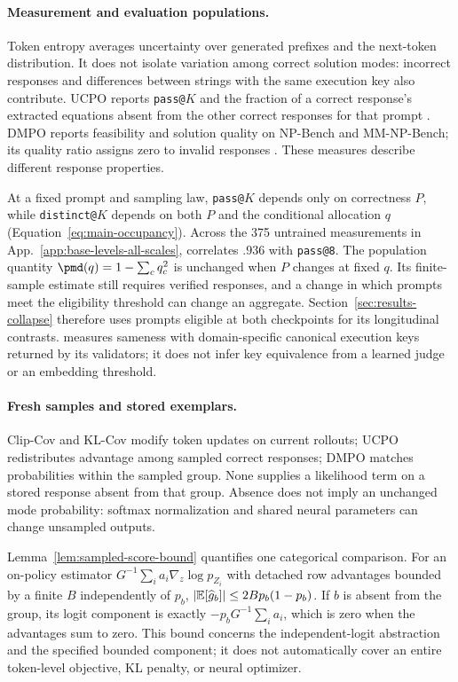 \paragraph{Measurement and evaluation populations.}
Token entropy averages uncertainty over generated prefixes and the next-token
distribution. It does not isolate variation among correct solution modes:
incorrect responses and differences between strings with the same execution
key also contribute. UCPO reports \texttt{pass@}$K$ and the fraction of a
correct response's extracted equations absent from the other correct
responses for that prompt \citep[App.~F]{lochab2026ucpo}. DMPO reports
feasibility and solution quality on NP-Bench and MM-NP-Bench; its quality
ratio assigns zero to invalid responses \citep[Section~4.2]{li2026distribution}.
These measures describe different response properties.

At a fixed prompt and sampling law, \texttt{pass@}$K$ depends only on
correctness $P$, while \texttt{distinct@}$K$ depends on both $P$ and the
conditional allocation $q$ (Equation~\eqref{eq:main-occupancy}). Across the
375 untrained measurements in App.~\ref{app:base-levels-all-scales},
\distk{} correlates $.936$ with \texttt{pass@8}.
The population quantity $\pmd(q)=1-\sum_cq_c^2$ is unchanged when $P$
changes at fixed $q$. Its finite-sample estimate still requires verified
responses, and a change in which prompts meet the eligibility threshold
can change an aggregate. Section~\ref{sec:results-collapse} therefore uses
prompts eligible at both checkpoints for its longitudinal contrasts.
\mb{} measures sameness with domain-specific canonical execution keys
returned by its validators; it does not infer key equivalence from a learned
judge or an embedding threshold.

\paragraph{Fresh samples and stored exemplars.}
Clip-Cov and KL-Cov modify token updates on current rollouts; UCPO
redistributes advantage among sampled correct responses; DMPO matches
probabilities within the sampled group. None supplies a likelihood term on
a stored response absent from that group. Absence does not imply an
unchanged mode probability: softmax normalization and shared neural
parameters can change unsampled outputs.

Lemma~\ref{lem:sampled-score-bound} quantifies one categorical comparison.
For an on-policy estimator $G^{-1}\sum_i a_i\nabla_z\log p_{Z_i}$ with
detached row advantages bounded by a finite $B$ independently of $p_b$,
$|\mathbb E[\widehat g_b]|\le2Bp_b(1-p_b)$. If $b$ is absent from the group,
its logit component is exactly $-p_bG^{-1}\sum_i a_i$, which is zero when
the advantages sum to zero. This bound concerns the independent-logit
abstraction and the specified bounded component; it does not automatically
cover an entire token-level objective, KL penalty, or neural optimizer.

